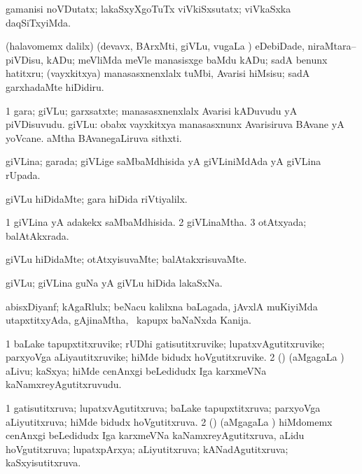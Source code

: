 \bentry
{}
\gl{\kirxvi}
\bmng
gamanisi noVDutatx; lakaSxyXgoTuTx viVkiSxsutatx; viVkaSxka daqSiTxyiMda. 
\emng
\eentry

\bentry
{}
\gl{\sakirx}
\bmng
(halavomemx \kaparx dalilx) (devavx, BArxMti, giVLu, \mo vugaLa \vi) eDebiDade, niraMtara--piVDisu, kADu; meVliMda meVle manasisxge baMdu kADu; sadA benunx hatitxru; (vayxkitxya) manasasxnenxlalx tuMbi, Avarisi hiMsisu; sadA garxhadaMte hiDidiru. 
\emng
\eentry

\bentry
{}
\gl{\nA}
\bmng
\bnum
\num{1} gara; giVLu; garxsatxte; manasasxnenxlalx Avarisi kADuvudu yA piVDisuvudu. 
 giVLu: 
\banum
{} obabx vayxkitxya manasasxnunx Avarisiruva BAvane yA yoVcane. 
 aMtha BAvanegaLiruva sithxti. 
\eanum
\numie
\enum
\emng
\eentry

\bentry
{}
\gl{\gu}
\bmng
giVLina; garada; giVLige saMbaMdhisida yA giVLiniMdAda yA giVLina rUpada. 
\emng
\eentry

\bentry
{}
\gl{\kirxvi}
\bmng
giVLu hiDidaMte; gara hiDida riVtiyalilx. 
\emng
\eentry

\bentry
{}
\gl{\gu}
\bmng
\bnum
\num{1} giVLina yA adakekx saMbaMdhisida. 
\num{2} giVLinaMtha. 
\num{3} otAtxyada; balAtAkxrada. 
\enum
\emng
\eentry

\bentry
{}
\gl{\kirxvi}
\bmng
giVLu hiDidaMte; otAtxyisuvaMte; balAtakxrisuvaMte. 
\emng
\eentry

\bentry
{}
\gl{\nA}
\bmng
giVLu; giVLina guNa yA giVLu hiDida lakaSxNa. 
\emng
\eentry

\bentry
{}
\gl{\nA}
\bmng
abisxDiyanf; kAgaRlulx; beNacu kalilxna baLagada, jAvxlA muKiyiMda utapxtitxyAda, gAjinaMtha, \sA\ kapupx baNaNxda Kanija. 
\emng
\eentry

\bentry
{}
\gl{\nA}
\bmng
\bnum
\num{1} baLake tapupxtitxruvike; rUDhi gatisutitxruvike; lupatxvAgutitxruvike; parxyoVga aLiyautitxruvike; hiMde bidudx hoVgutitxruvike. 
\num{2} (\jiVvi) (aMgagaLa \vi) aLivu; kaSxya; hiMde cenAnxgi beLedidudx Iga karxmeVNa kaNamxreyAgutitxruvudu. 
\enum
\emng
\eentry

\bentry
{}
\gl{\gu}
\bmng
\bnum
\num{1} gatisutitxruva; lupatxvAgutitxruva; baLake tapupxtitxruva; parxyoVga aLiyutitxruva; hiMde bidudx hoVgutitxruva. 
\num{2} (\jiVvi) (aMgagaLa \vi) hiMdomemx cenAnxgi beLedidudx Iga karxmeVNa kaNamxreyAgutitxruva, aLidu hoVgutitxruva; lupatxpArxya; aLiyutitxruva; kANadAgutitxruva; kaSxyisutitxruva. 
\enum
\emng
\eentry

